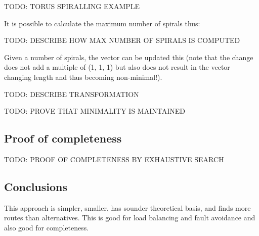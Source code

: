 			TODO: TORUS SPIRALLING EXAMPLE
			
			It is possible to calculate the maximum number of spirals thus:
			
			TODO: DESCRIBE HOW MAX NUMBER OF SPIRALS IS COMPUTED
			
			Given a number of spirals, the vector can be updated this (note that the
			change does not add a multiple of (1, 1, 1) but also does not result in
			the vector changing length and thus becoming non-minimal!).
			
			TODO: DESCRIBE TRANSFORMATION
			
			TODO: PROVE THAT MINIMALITY IS MAINTAINED
		
		\subsection{Proof of completeness}
		
			TODO: PROOF OF COMPLETENESS BY EXHAUSTIVE SEARCH
	
		\subsection{Conclusions}
			
			This approach is simpler, smaller, has sounder theoretical basis, and
			finds more routes than alternatives. This is good for load balancing and
			fault avoidance and also good for completeness.

